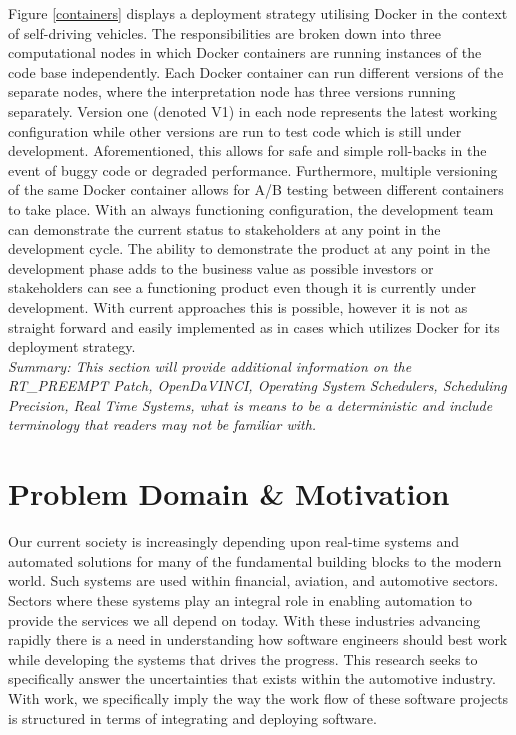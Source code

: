 Figure \ref{containers} displays a deployment strategy utilising Docker in the context of self-driving vehicles. The responsibilities are broken down into three computational nodes in which Docker containers are running instances of the code base independently. Each Docker container can run different versions of the separate nodes, where the interpretation node has three versions running separately. Version one (denoted V1) in each node represents the latest working configuration while other versions are run to test code which is still under development. Aforementioned, this allows for safe and simple roll-backs in the event of buggy code or degraded performance. Furthermore, multiple versioning of the same Docker container allows for A/B testing between different containers to take place. With an always functioning configuration, the development team can demonstrate the current status to stakeholders at any point in the development cycle. The ability to demonstrate the product at any point in the development phase adds to the business value as possible investors or stakeholders can see a functioning product even though it is currently under development. With current approaches this is possible, however it is not as straight forward and easily implemented as in cases which utilizes Docker for its deployment strategy.\\

\textit{Summary: This section will provide additional information on the RT\_PREEMPT Patch, OpenDaVINCI, Operating System Schedulers, Scheduling Precision, Real Time Systems,  what is means to be a deterministic and include terminology that readers may not be familiar with.}



\section{Problem Domain \& Motivation}
Our current society is increasingly depending upon real-time systems and automated solutions for many of the fundamental building blocks to the modern world. Such systems are used within financial, aviation, and automotive sectors. Sectors where these systems play an integral role in enabling automation to provide the services we all depend on today. With these industries advancing rapidly there is a need in understanding how software engineers should best work while developing the systems that drives the progress. This research seeks to specifically answer the uncertainties that exists within the automotive industry. With work, we specifically imply the way the work flow of these software projects is structured in terms of integrating and deploying software.\\

